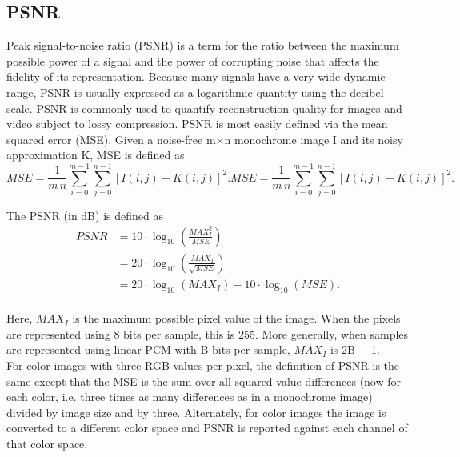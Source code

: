 \documentclass[a4paper, 10pt]{book}
\begin{document}
\subsection{PSNR}
Peak signal-to-noise ratio (PSNR) is a term for the ratio between the maximum possible power of a signal and the power of corrupting noise that affects the fidelity of its representation. 
Because many signals have a very wide dynamic range, PSNR is usually expressed as a logarithmic quantity using the decibel scale.
PSNR is commonly used to quantify reconstruction quality for images and video subject to lossy compression.
PSNR is most easily defined via the mean squared error (MSE). Given a noise-free m×n monochrome image I and its noisy approximation K, MSE is defined as
\begin{equation}\label{eqn:MSE}
{\displaystyle {\mathit {MSE}}={\frac {1}{m\,n}}\sum _{i=0}^{m-1}\sum _{j=0}^{n-1}[I(i,j)-K(i,j)]^{2}.}{\displaystyle {\mathit {MSE}}={\frac {1}{m\,n}}\sum _{i=0}^{m-1}\sum _{j=0}^{n-1}[I(i,j)-K(i,j)]^{2}.}
\end{equation}

The PSNR (in dB) is defined as
\begin{equation}\label{eqn:PSNR}
{\displaystyle {\begin{aligned}{\mathit {PSNR}}&=10\cdot \log _{10}\left({\frac {{\mathit {MAX}}_{I}^{2}}{\mathit {MSE}}}\right)\\&=20\cdot \log _{10}\left({\frac {{\mathit {MAX}}_{I}}{\sqrt {\mathit {MSE}}}}\right)\\&=20\cdot \log _{10}({\mathit {MAX}}_{I})-10\cdot \log _{10}({\mathit {MSE}}).\end{aligned}}}
\end{equation}
\\
Here, $MAX_I$ is the maximum possible pixel value of the image. When the pixels are represented using 8 bits per sample, this is 255. More generally, when samples are represented using linear PCM with B bits per sample, $MAX_I$ is 2B − 1.
\\
For color images with three RGB values per pixel, the definition of PSNR is the same except that the MSE is the sum over all squared value differences (now for each color, i.e. three times as many differences as in a monochrome image) divided by image size and by three. Alternately, for color images the image is converted to a different color space and PSNR is reported against each channel of that color space.
\end{document}
